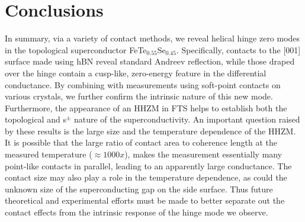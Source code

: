 \section{Conclusions}
In summary, via a variety of contact methods, we reveal helical hinge zero modes in the topological superconductor FeTe$_{0.55}$Se$_{0.45}$. Specifically,  contacts to the [001] surface made using hBN reveal standard Andreev reflection, while those draped over the hinge contain a cusp-like, zero-energy feature in the differential conductance. By combining with measurements using soft-point contacts on various crystals, we further confirm the intrinsic nature of this new mode. Furthermore, the appearance of an HHZM in FTS helps to establish both the topological and s$^{\pm}$ nature of the superconductivity. An important question raised by these results is the large size and the temperature dependence of the HHZM. It is possible that the large ratio of contact area to coherence length at the measured temperature ($\approx 1000x$), makes the measurement essentially many point-like contacts in parallel, leading to an apparently large conductance. The contact size may also play a role in the temperature dependence, as could the unknown size of the superconducting gap on the side surface. Thus future theoretical and experimental efforts must be made to better separate out the contact effects from the intrinsic response of the hinge mode we observe. 